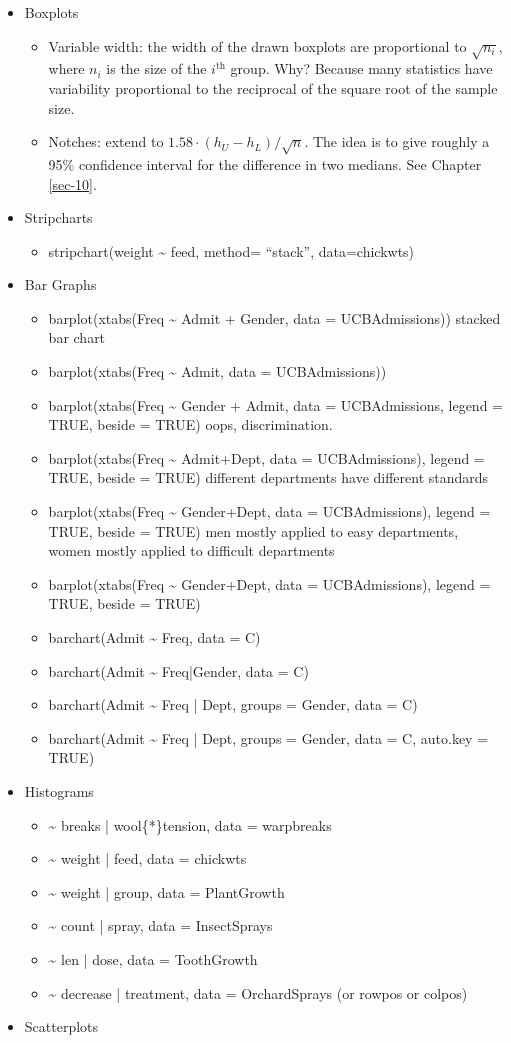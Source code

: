 \documentclass[captions=tableheading]{scrbook}
\begin{document}
\begin{itemize}
\item Boxplots
\begin{itemize}
\item Variable width: the width of the drawn boxplots are proportional to \(\sqrt{n_{i}}\), where \(n_{i}\) is the size of the \(i^{\mathrm{th}}\) group. Why? Because many statistics have variability proportional to the reciprocal of the square root of the sample size.
\item Notches: extend to \(1.58\cdot(h_{U}-h_{L})/\sqrt{n}\). The idea is to give roughly a 95\% confidence interval for the difference in two medians. See Chapter \ref{sec-10}.
\end{itemize}
\item Stripcharts
\begin{itemize}
\item stripchart(weight \~{} feed, method= ``stack'', data=chickwts)
\end{itemize}
\item Bar Graphs
\begin{itemize}
\item barplot(xtabs(Freq \~{} Admit + Gender, data = UCBAdmissions)) stacked bar chart
\item barplot(xtabs(Freq \~{} Admit, data = UCBAdmissions))
\item barplot(xtabs(Freq \~{} Gender + Admit, data = UCBAdmissions, legend = TRUE, beside = TRUE)  oops, discrimination.
\item barplot(xtabs(Freq \~{} Admit+Dept, data = UCBAdmissions), legend = TRUE, beside = TRUE) different departments have different standards
\item barplot(xtabs(Freq \~{} Gender+Dept, data = UCBAdmissions), legend = TRUE, beside = TRUE) men mostly applied to easy departments, women mostly applied to difficult departments
\item barplot(xtabs(Freq \~{} Gender+Dept, data = UCBAdmissions), legend = TRUE, beside = TRUE)
\item barchart(Admit \~{} Freq, data = C)
\item barchart(Admit \~{} Freq|Gender, data = C)
\item barchart(Admit \~{} Freq | Dept, groups = Gender, data = C)
\item barchart(Admit \~{} Freq | Dept, groups = Gender, data = C, auto.key = TRUE)
\end{itemize}
\item Histograms
\begin{itemize}
\item \~{} breaks | wool\{*\}tension, data = warpbreaks
\item \~{} weight | feed, data = chickwts
\item \~{} weight | group, data = PlantGrowth
\item \~{} count | spray, data = InsectSprays
\item \~{} len | dose, data = ToothGrowth
\item \~{} decrease | treatment, data = OrchardSprays (or rowpos or colpos)
\end{itemize}
\item Scatterplots
\end{itemize}
\end{document}
